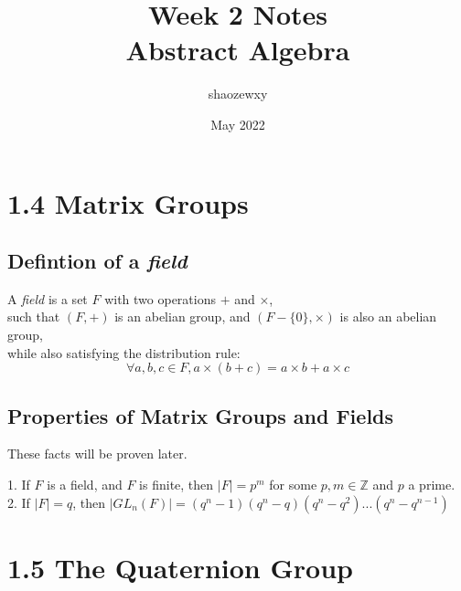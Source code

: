 \documentclass{article}
\title{Week 2 Notes\\
\large{Abstract Algebra}}
\author{shaozewxy }
\date{May 2022}
\begin{document}
\maketitle

\setcounter{secnumdepth}{0}
\section{1.4 Matrix Groups}
\subsection{Defintion of a \textit{field}}
\begin{addmargin}[1em]{0em}
A \textit{field} is a set $F$ with two operations $+$ and $\times$,\\
such that $(F,+)$ is an abelian group, and $(F-\{0\}, \times)$ is also an abelian group,\\
while also satisfying the distribution rule:
\begin{equation*}
\forall a,b,c \in F, a\times(b+c) = a\times b+a\times c
\end{equation*}
\end{addmargin}
\subsection{Properties of Matrix Groups and Fields}
These facts will be proven later.
\begin{addmargin}[1em]{0em}
1. If $F$ is a field, and $F$ is finite, then $|F| = p^m$ for some $p, m \in \mathbb{Z}$ and $p$ a prime.\\
2. If $|F| = q$, then $|GL_n(F)| = (q^n-1)(q^n-q)(q^n-q^2)...(q^n-q^{n-1})$
\end{addmargin}

\section{1.5 The Quaternion Group}
\end{document}
